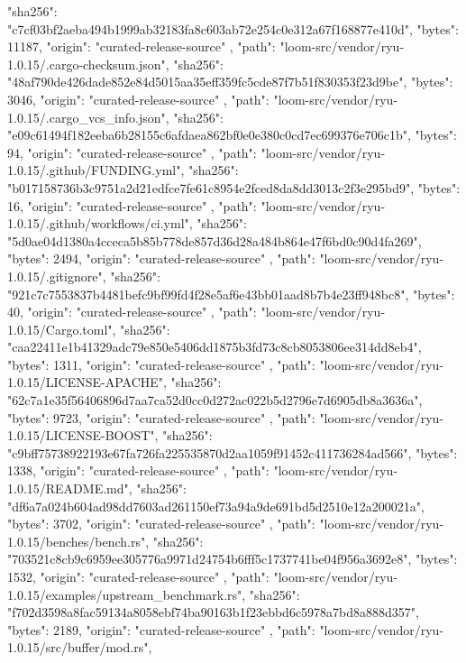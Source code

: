 {{      "sha256": "c7cf03bf2aeba494b1999ab32183fa8c603ab72e254c0e312a67f168877e410d",
      "bytes": 11187,
      "origin": "curated-release-source"
    },
    {
      "path": "loom-src/vendor/ryu-1.0.15/.cargo-checksum.json",
      "sha256": "48af790de426dade852e84d5015aa35eff359fc5cde87f7b51f830353f23d9be",
      "bytes": 3046,
      "origin": "curated-release-source"
    },
    {
      "path": "loom-src/vendor/ryu-1.0.15/.cargo_vcs_info.json",
      "sha256": "e09c61494f182eeba6b28155c6afdaea862bf0e0e380c0cd7ec699376e706c1b",
      "bytes": 94,
      "origin": "curated-release-source"
    },
    {
      "path": "loom-src/vendor/ryu-1.0.15/.github/FUNDING.yml",
      "sha256": "b017158736b3c9751a2d21edfce7fe61c8954e2fced8da8dd3013c2f3e295bd9",
      "bytes": 16,
      "origin": "curated-release-source"
    },
    {
      "path": "loom-src/vendor/ryu-1.0.15/.github/workflows/ci.yml",
      "sha256": "5d0ae04d1380a4cceca5b85b778de857d36d28a484b864e47f6bd0c90d4fa269",
      "bytes": 2494,
      "origin": "curated-release-source"
    },
    {
      "path": "loom-src/vendor/ryu-1.0.15/.gitignore",
      "sha256": "921c7c7553837b4481befc9bf99fd4f28e5af6e43bb01aad8b7b4e23ff948bc8",
      "bytes": 40,
      "origin": "curated-release-source"
    },
    {
      "path": "loom-src/vendor/ryu-1.0.15/Cargo.toml",
      "sha256": "caa22411e1b41329adc79e850e5406dd1875b3fd73c8cb8053806ee314dd8eb4",
      "bytes": 1311,
      "origin": "curated-release-source"
    },
    {
      "path": "loom-src/vendor/ryu-1.0.15/LICENSE-APACHE",
      "sha256": "62c7a1e35f56406896d7aa7ca52d0cc0d272ac022b5d2796e7d6905db8a3636a",
      "bytes": 9723,
      "origin": "curated-release-source"
    },
    {
      "path": "loom-src/vendor/ryu-1.0.15/LICENSE-BOOST",
      "sha256": "c9bff75738922193e67fa726fa225535870d2aa1059f91452c411736284ad566",
      "bytes": 1338,
      "origin": "curated-release-source"
    },
    {
      "path": "loom-src/vendor/ryu-1.0.15/README.md",
      "sha256": "df6a7a024b604ad98dd7603ad261150ef73a94a9de691bd5d2510e12a200021a",
      "bytes": 3702,
      "origin": "curated-release-source"
    },
    {
      "path": "loom-src/vendor/ryu-1.0.15/benches/bench.rs",
      "sha256": "703521c8cb9c6959ee305776a9971d24754b6fff5c1737741be04f956a3692e8",
      "bytes": 1532,
      "origin": "curated-release-source"
    },
    {
      "path": "loom-src/vendor/ryu-1.0.15/examples/upstream_benchmark.rs",
      "sha256": "f702d3598a8fac59134a8058ebf74ba90163b1f23ebbd6c5978a7bd8a888d357",
      "bytes": 2189,
      "origin": "curated-release-source"
    },
    {
      "path": "loom-src/vendor/ryu-1.0.15/src/buffer/mod.rs",
}}
